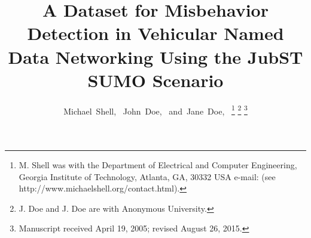 \documentclass[journal,comsoc]{IEEEtran}
\begin{document}
%
\title{A Dataset for Misbehavior Detection in Vehicular Named Data Networking Using the JubST SUMO Scenario}
%
%
%

\author{Michael~Shell,~
        John~Doe,~
        and~Jane~Doe,~%
\thanks{M. Shell was with the Department
of Electrical and Computer Engineering, Georgia Institute of Technology, Atlanta,
GA, 30332 USA e-mail: (see http://www.michaelshell.org/contact.html).}%
\thanks{J. Doe and J. Doe are with Anonymous University.}%
\thanks{Manuscript received April 19, 2005; revised August 26, 2015.}}

% 
%
\end{document}
